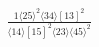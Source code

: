 \documentclass[varwidth, border=5pt]{standalone}
\begin{document}
\begin{my}
$\begin{gathered}
\scriptscriptstyle\frac{1⟨25⟩^2⟨34⟩[13]^2}{⟨14⟩[15]^2⟨23⟩⟨45⟩^2}
\end{gathered}$
\end{my}
\end{document}
